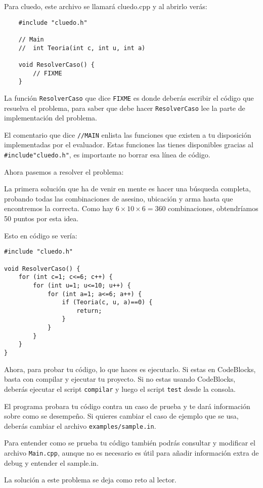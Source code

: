 Para cluedo, este archivo se llamará cluedo.cpp y al abrirlo verás:

\begin{lstlisting}
	#include "cluedo.h"
	
	// Main
	//	int Teoria(int c, int u, int a)
	
	void ResolverCaso() {
		// FIXME
	}
\end{lstlisting}

La función \verb|ResolverCaso| que dice \verb|FIXME| es donde deberás escribir el código que resuelva el problema, para saber que debe hacer \verb|ResolverCaso| lee la parte de implementación del problema. 

El comentario que dice \verb|//MAIN| enlista las funciones que existen a tu disposición implementadas por el evaluador. Estas funciones las tienes disponibles gracias al \verb|#include"cluedo.h"|, es importante no borrar esa línea de código.

Ahora pasemos a resolver el problema:

La primera solución que ha de venir en mente es hacer una búsqueda completa, probando todas las combinaciones de asesino, ubicación y arma hasta que encontremos la correcta. Como hay \(6\times 10 \times 6 = 360\) combinaciones, obtendríamos 50 puntos por esta idea.

Esto en código se vería:
\pagebreak
\begin{lstlisting}
#include "cluedo.h"

void ResolverCaso() {
	for (int c=1; c<=6; c++) {
		for (int u=1; u<=10; u++) {
			for (int a=1; a<=6; a++) {
				if (Teoria(c, u, a)==0) {
					return;	
				}
			}
		}
	}
}
\end{lstlisting}

Ahora, para probar tu código, lo que haces es ejecutarlo. Si estas en CodeBlocks, basta con compilar y ejecutar tu proyecto. Si no estas usando CodeBlocks, deberás ejecutar el script \verb|compilar| y luego el script \verb|test| desde la consola.

El programa probara tu código contra un caso de prueba y te dará información sobre como se desempeño. Si quieres cambiar el caso de ejemplo que se usa, deberás cambiar el archivo \verb|examples/sample.in|.

Para entender como se prueba tu código también podrás consultar y modificar el archivo \verb|Main.cpp|, aunque no es necesario es útil para añadir información extra de debug y entender el sample.in.


La solución a este problema se deja como reto al lector.


